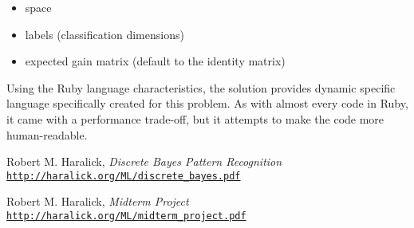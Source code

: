 \documentclass[letterpaper, conference]{IEEEtran}
\begin{document}
\begin{itemize}
  \item space
  \item labels (classification dimensions)
  \item expected gain matrix (default to the identity matrix)
\end{itemize}

Using the Ruby language characteristics, the solution provides dynamic specific language specifically created for this problem. As with almost every code in Ruby, it came with a performance trade-off, but it attempts to make the code more human-readable.

\begin{thebibliography}{2}

Robert M. Haralick,
\textit{Discrete Bayes Pattern Recognition}
\\\texttt{\url{http://haralick.org/ML/discrete_bayes.pdf}}

Robert M. Haralick,
\textit{Midterm Project}
\\\texttt{\url{http://haralick.org/ML/midterm_project.pdf}}

\end{thebibliography}
\end{document}
